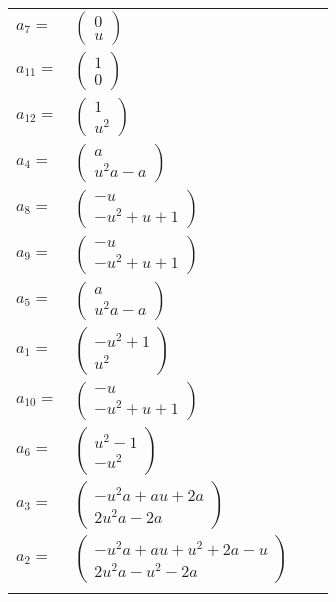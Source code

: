 \documentclass[1p]{elsarticle_modified}
\theoremstyle{definition}
\begin{document}
\begin{tabular}{m{7pt} m{180pt} m{7pt} m{180pt} }
\flushright $a_{7}=$&$\begin{pmatrix}0\\u\end{pmatrix}$ \\
\flushright $a_{11}=$&$\begin{pmatrix}1\\0\end{pmatrix}$ \\
\flushright $a_{12}=$&$\begin{pmatrix}1\\u^2\end{pmatrix}$ \\
\flushright $a_{4}=$&$\begin{pmatrix}a\\u^2 a- a\end{pmatrix}$ \\
\flushright $a_{8}=$&$\begin{pmatrix}- u\\- u^2+u+1\end{pmatrix}$ \\
\flushright $a_{9}=$&$\begin{pmatrix}- u\\- u^2+u+1\end{pmatrix}$ \\
\flushright $a_{5}=$&$\begin{pmatrix}a\\u^2 a- a\end{pmatrix}$ \\
\flushright $a_{1}=$&$\begin{pmatrix}- u^2+1\\u^2\end{pmatrix}$ \\
\flushright $a_{10}=$&$\begin{pmatrix}- u\\- u^2+u+1\end{pmatrix}$ \\
\flushright $a_{6}=$&$\begin{pmatrix}u^2-1\\- u^2\end{pmatrix}$ \\
\flushright $a_{3}=$&$\begin{pmatrix}- u^2 a+a u+2 a\\2 u^2 a-2 a\end{pmatrix}$ \\
\flushright $a_{2}=$&$\begin{pmatrix}- u^2 a+a u+u^2+2 a- u\\2 u^2 a- u^2-2 a\end{pmatrix}$\\&\end{tabular}
\end{document}
